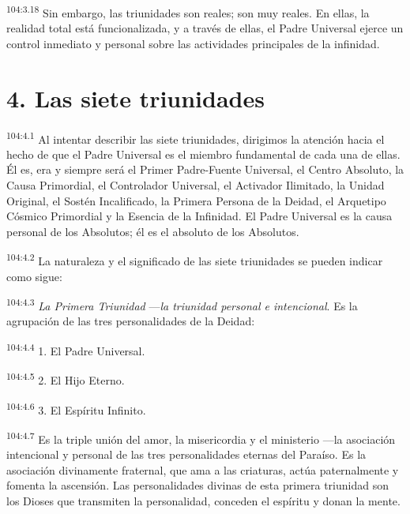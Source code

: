 \par
\textsuperscript{104:3.18} Sin embargo, las triunidades son reales; son muy reales. En ellas, la realidad total está funcionalizada, y a través de ellas, el Padre Universal ejerce un control inmediato y personal sobre las actividades principales de la infinidad.

\section*{4. Las siete triunidades}
\par
\textsuperscript{104:4.1} Al intentar describir las siete triunidades, dirigimos la atención hacia el hecho de que el Padre Universal es el miembro fundamental de cada una de ellas. Él es, era y siempre será el Primer Padre-Fuente Universal, el Centro Absoluto, la Causa Primordial, el Controlador Universal, el Activador Ilimitado, la Unidad Original, el Sostén Incalificado, la Primera Persona de la Deidad, el Arquetipo Cósmico Primordial y la Esencia de la Infinidad. El Padre Universal es la causa personal de los Absolutos; él es el absoluto de los Absolutos.

\par
\textsuperscript{104:4.2} La naturaleza y el significado de las siete triunidades se pueden indicar como sigue:

\par
\textsuperscript{104:4.3} \textit{La Primera Triunidad} ---\textit{la triunidad personal e intencional}. Es la agrupación de las tres personalidades de la Deidad:

\par
\textsuperscript{104:4.4} 1. El Padre Universal.

\par
\textsuperscript{104:4.5} 2. El Hijo Eterno.

\par
\textsuperscript{104:4.6} 3. El Espíritu Infinito.

\par
\textsuperscript{104:4.7} Es la triple unión del amor, la misericordia y el ministerio ---la asociación intencional y personal de las tres personalidades eternas del Paraíso. Es la asociación divinamente fraternal, que ama a las criaturas, actúa paternalmente y fomenta la ascensión. Las personalidades divinas de esta primera triunidad son los Dioses que transmiten la personalidad, conceden el espíritu y donan la mente.

